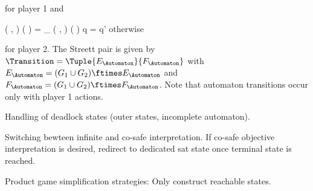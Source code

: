 for player 1 and

\startformula
    \Transition
        \Big( ,  \Big)
        \Big(  \Big)
    = \startmathcases
        \NC \Transition_\GameGraph
        \Big( ,  \Big)
        \Big(  \Big)
        \MC \StartIf q = q'
        \NR
        \NC otherwise
        \NR
    \stopmathcases
\stopformula

for player 2.
The Streett pair is given by $\Transition = \Tuple{E_\Automaton}{F_\Automaton}$ with $E_\Automaton = (G_1 \cup G_2) \ftimes E_\Automaton$ and $F_\Automaton = (G_1 \cup G_2) \ftimes F_\Automaton$.
Note that automaton transitions occur only with player 1 actions.

Handling of deadlock states (outer states, incomplete automaton).

Switching bewteen infinite and co-safe interpretation.
If co-safe objective interpretation is desired, redirect to dedicated sat state once terminal state is reached.

Product game simplification strategies:
Only construct reachable states.

